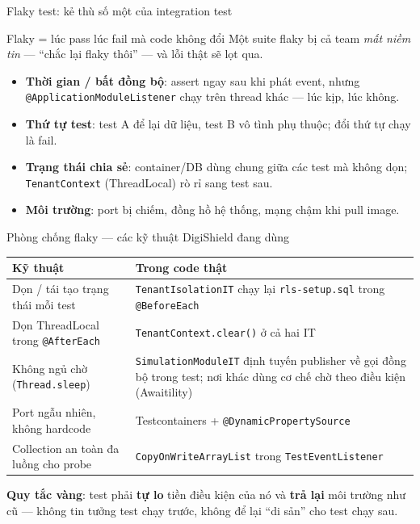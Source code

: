 \documentclass[aspectratio=169,12pt]{beamer}
\begin{document}
\begin{frame}{Flaky test: kẻ thù số một của integration test}
  \begin{block}{Flaky = lúc pass lúc fail mà code không đổi}
    Một suite flaky bị cả team \emph{mất niềm tin} --- ``chắc lại flaky
    thôi'' --- và lỗi thật sẽ lọt qua.
  \end{block}
  \begin{itemize}
    \item \textbf{Thời gian / bất đồng bộ}: assert ngay sau khi phát event,
      nhưng \texttt{@ApplicationModuleListener} chạy trên thread khác ---
      lúc kịp, lúc không.
    \item \textbf{Thứ tự test}: test A để lại dữ liệu, test B vô tình phụ
      thuộc; đổi thứ tự chạy là fail.
    \item \textbf{Trạng thái chia sẻ}: container/DB dùng chung giữa các test
      mà không dọn; \texttt{TenantContext} (ThreadLocal) rò rỉ sang test sau.
    \item \textbf{Môi trường}: port bị chiếm, đồng hồ hệ thống, mạng chậm
      khi pull image.
  \end{itemize}
\end{frame}

\begin{frame}{Phòng chống flaky --- các kỹ thuật DigiShield đang dùng}
  \begin{center}
  \footnotesize
  \setlength{\tabcolsep}{4pt}
  \begin{tabular}{>{\raggedright\arraybackslash}p{5.2cm}>{\raggedright\arraybackslash}p{6.6cm}}
    \toprule
    \textbf{Kỹ thuật} & \textbf{Trong code thật} \\
    \midrule
    Dọn / tái tạo trạng thái mỗi test &
    \texttt{TenantIsolationIT} chạy lại \texttt{rls-setup.sql} trong
    \texttt{@BeforeEach} \\
    Dọn ThreadLocal trong \texttt{@AfterEach} &
    \texttt{TenantContext.clear()} ở cả hai IT \\
    Không ngủ chờ (\texttt{Thread.sleep}) &
    \texttt{SimulationModuleIT} định tuyến publisher về gọi đồng bộ trong
    test; nơi khác dùng cơ chế chờ theo điều kiện (Awaitility) \\
    Port ngẫu nhiên, không hardcode &
    Testcontainers + \texttt{@DynamicPropertySource} \\
    Collection an toàn đa luồng cho probe &
    \texttt{CopyOnWriteArrayList} trong \texttt{TestEventListener} \\
    \bottomrule
  \end{tabular}
  \end{center}
  {\small \textbf{Quy tắc vàng}: test phải \textbf{tự lo} tiền điều kiện của nó
  và \textbf{trả lại} môi trường như cũ --- không tin tưởng test chạy trước,
  không để lại ``di sản'' cho test chạy sau.}
\end{frame}
\end{document}
